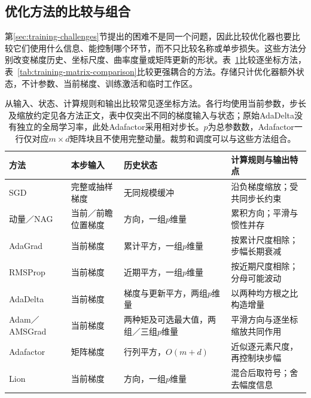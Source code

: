 \subsection{优化方法的比较与组合}
\label{sec:training-optimizer-comparison}

第\ref{sec:training-challenges}节提出的困难不是同一个问题，因此比较优化器也要比较它们使用什么信息、能控制哪个环节，而不只比较名称或单步损失。这些方法分别改变梯度历史、坐标尺度、曲率度量或矩阵更新的形状。表~\ref{tab:training-first-order-comparison}比较逐坐标方法，表~\ref{tab:training-matrix-comparison}比较更强耦合的方法。存储只计优化器额外状态，不计参数、当前梯度、训练激活和临时工作区。
\begin{table}[htbp]
  \centering\small
  \begin{tabularx}{\linewidth}{@{}p{26mm}p{40mm}p{27mm}X@{}}
    \toprule
    方法 & 本步输入 & 历史状态 & 计算规则与输出特点 \\
    \midrule
    SGD & 完整或抽样梯度 & 无同规模缓冲 & 沿负梯度缩放；受共同步长约束 \\
    动量／NAG & 当前／前瞻位置梯度 & 方向，一组$p$维量 & 累积方向；平滑与惯性并存 \\
    AdaGrad & 当前梯度 & 累计平方，一组$p$维量 & 按累计尺度相除；步幅长期衰减 \\
    RMSProp & 当前梯度 & 近期平方，一组$p$维量 & 按近期尺度相除；分母可能波动 \\
    AdaDelta & 当前梯度 & 梯度与更新平方，两组$p$维量 & 以两种均方根之比构造增量 \\
    Adam／AMSGrad & 当前梯度 & 两种矩及可选最大值，两组／三组$p$维量 & 平滑方向与逐坐标缩放共同作用 \\
    Adafactor & 矩阵梯度 & 行列平方，$O(m+d)$ & 近似逐元素尺度，再控制块步幅 \\
    Lion & 当前梯度 & 方向，一组$p$维量 & 混合后取符号；舍去幅度信息 \\
    \bottomrule
  \end{tabularx}
  \caption{从输入、状态、计算规则和输出比较常见逐坐标方法。各行均使用当前参数，步长及缩放约定见各方法正文，表中仅突出不同的梯度输入与状态；原始AdaDelta没有独立的全局学习率，此处Adafactor采用相对步长。$p$为总参数数，Adafactor一行仅对应$m\times d$矩阵块且不使用完整动量。裁剪和调度可以与这些方法组合。}
  \label{tab:training-first-order-comparison}
\end{table}
\FloatBarrier

